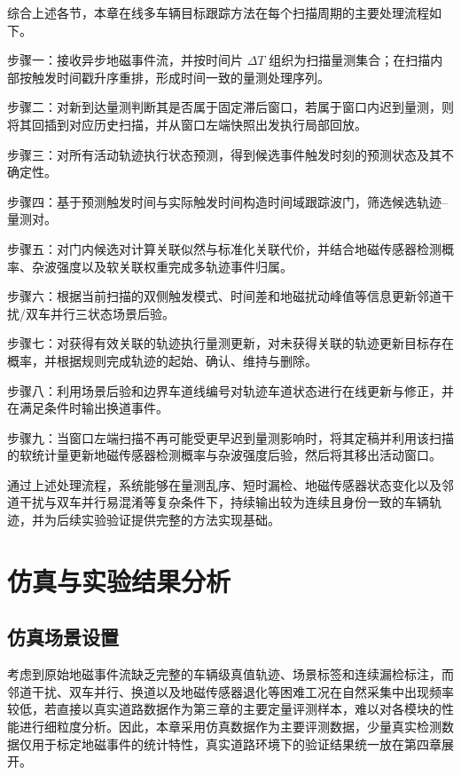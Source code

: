 \documentclass{xdupgthesis}
\begin{document}
综合上述各节，本章在线多车辆目标跟踪方法在每个扫描周期的主要处理流程如下。

步骤一：接收异步地磁事件流，并按时间片 $\Delta T$ 组织为扫描量测集合；在扫描内部按触发时间戳升序重排，形成时间一致的量测处理序列。

步骤二：对新到达量测判断其是否属于固定滞后窗口，若属于窗口内迟到量测，则将其回插到对应历史扫描，并从窗口左端快照出发执行局部回放。

步骤三：对所有活动轨迹执行状态预测，得到候选事件触发时刻的预测状态及其不确定性。

步骤四：基于预测触发时间与实际触发时间构造时间域跟踪波门，筛选候选轨迹--量测对。

步骤五：对门内候选对计算关联似然与标准化关联代价，并结合地磁传感器检测概率、杂波强度以及软关联权重完成多轨迹事件归属。

步骤六：根据当前扫描的双侧触发模式、时间差和地磁扰动峰值等信息更新邻道干扰/双车并行三状态场景后验。

步骤七：对获得有效关联的轨迹执行量测更新，对未获得关联的轨迹更新目标存在概率，并根据规则完成轨迹的起始、确认、维持与删除。

步骤八：利用场景后验和边界车道线编号对轨迹车道状态进行在线更新与修正，并在满足条件时输出换道事件。

步骤九：当窗口左端扫描不再可能受更早迟到量测影响时，将其定稿并利用该扫描的软统计量更新地磁传感器检测概率与杂波强度后验，然后将其移出活动窗口。

通过上述处理流程，系统能够在量测乱序、短时漏检、地磁传感器状态变化以及邻道干扰与双车并行易混淆等复杂条件下，持续输出较为连续且身份一致的车辆轨迹，并为后续实验验证提供完整的方法实现基础。


\section{仿真与实验结果分析}
\label{sec:ch3_experiment}

\subsection{仿真场景设置}

考虑到原始地磁事件流缺乏完整的车辆级真值轨迹、场景标签和连续漏检标注，而邻道干扰、双车并行、换道以及地磁传感器退化等困难工况在自然采集中出现频率较低，若直接以真实道路数据作为第三章的主要定量评测样本，难以对各模块的性能进行细粒度分析。因此，本章采用仿真数据作为主要评测数据，少量真实检测数据仅用于标定地磁事件的统计特性，真实道路环境下的验证结果统一放在第四章展开。
\end{document}
